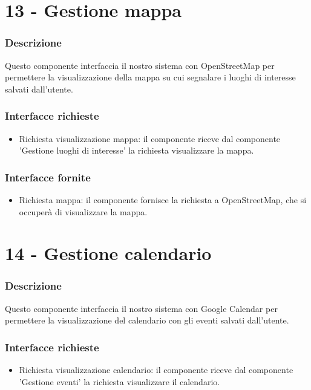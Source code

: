 \documentclass[a4paper,12pt]{article}
\begin{document}
\section*{13 -  Gestione mappa}
\subsubsection*{Descrizione}
Questo componente interfaccia il nostro sistema con OpenStreetMap per permettere la visualizzazione della mappa su cui segnalare i luoghi di interesse salvati dall'utente.
\subsubsection*{Interfacce richieste}
\begin{itemize} \setlength\itemsep{0.01em}
\item {\sffamily Richiesta visualizzazione mappa}: il componente riceve dal componente 'Gestione luoghi di interesse' la richiesta visualizzare la mappa.
\end{itemize}
\subsubsection*{Interfacce fornite}
\begin{itemize} \setlength\itemsep{0.01em}
\item {\sffamily Richiesta mappa}: il componente fornisce la richiesta a OpenStreetMap, che si occuperà di visualizzare la mappa.
\end{itemize}

\section*{14 -  Gestione calendario}
\subsubsection*{Descrizione}
Questo componente interfaccia il nostro sistema con Google Calendar per permettere la visualizzazione del calendario con gli eventi salvati dall'utente.
\subsubsection*{Interfacce richieste}
\begin{itemize} \setlength\itemsep{0.01em}
\item {\sffamily Richiesta visualizzazione calendario}: il componente riceve dal componente 'Gestione eventi' la richiesta visualizzare il calendario.
\end{itemize}
\end{document}
